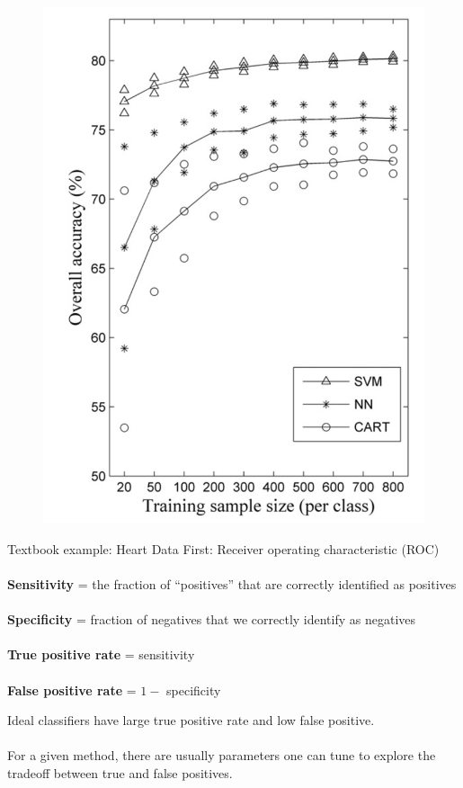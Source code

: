 \documentclass[mathserif, aspectratio=169]{beamer}
\begin{document}
\begin{frame}{}
\begin{figure}
\includegraphics[height=\textheight]{shao_performance}
\caption*{}
\end{figure}
\end{frame}

\begin{frame}{Textbook example: Heart Data}
First: Receiver operating characteristic (ROC)\\~\\

\textbf{Sensitivity} = the fraction of ``positives'' that are correctly identified as positives  \\~\\

\textbf{Specificity} = fraction of negatives that we correctly identify as negatives \\~\\

\textbf{True positive rate} = sensitivity\\~\\

\textbf{False positive rate} = $1-$ specificity

Ideal classifiers have large true positive rate and low false positive.  \\~\\

For a given method, there are usually parameters one can tune to explore the tradeoff between true and false positives.  
\end{frame}
\end{document}
